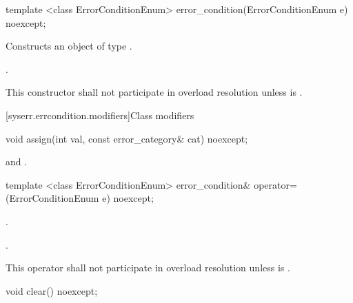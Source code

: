 %
\begin{itemdecl}
template <class ErrorConditionEnum>
  error_condition(ErrorConditionEnum e) noexcept;
\end{itemdecl}

\begin{itemdescr}
\pnum
\effects Constructs an object of type .

\pnum
\postcondition {}.

\pnum
\remarks This constructor shall not participate in overload resolution unless\linebreak
{} is .
\end{itemdescr}


[syserr.errcondition.modifiers]{Class  modifiers}

\begin{itemdecl}
void assign(int val, const error_category& cat) noexcept;
\end{itemdecl}

\begin{itemdescr}
\pnum
\postconditions {} and .
\end{itemdescr}

\begin{itemdecl}
template <class ErrorConditionEnum>
    error_condition& operator=(ErrorConditionEnum e) noexcept;
\end{itemdecl}

\begin{itemdescr}
\pnum
\postcondition {}.

\pnum
\returns {}.

\pnum
\remarks This operator shall not participate in overload resolution unless\linebreak
{} is .
\end{itemdescr}

\begin{itemdecl}
void clear() noexcept;
\end{itemdecl}


